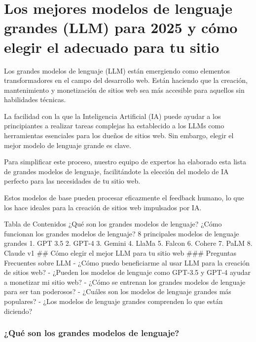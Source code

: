 \documentclass[a4paper12pt]{article}
\begin{document}
    \hypertarget{los-mejores-modelos-de-lenguaje-grandes-llm-para-2025-y-cuxf3mo-elegir-el-adecuado-para-tu-sitio}{%
\section{Los mejores modelos de lenguaje grandes (LLM) para 2025 y cómo
elegir el adecuado para tu
sitio}\label{los-mejores-modelos-de-lenguaje-grandes-llm-para-2025-y-cuxf3mo-elegir-el-adecuado-para-tu-sitio}}

Los grandes modelos de lenguaje (LLM) están emergiendo como elementos
transformadores en el campo del desarrollo web. Están haciendo que la
creación, mantenimiento y monetización de sitios web sea más accesible
para aquellos sin habilidades técnicas.

La facilidad con la que la Inteligencia Artificial (IA) puede ayudar a
los principiantes a realizar tareas complejas ha establecido a los LLMs
como herramientas esenciales para los dueños de sitios web. Sin embargo,
elegir el mejor modelo de lenguaje grande es clave.

Para simplificar este proceso, nuestro equipo de expertos ha elaborado
esta lista de grandes modelos de lenguaje, facilitándote la elección del
modelo de IA perfecto para las necesidades de tu sitio web.

Estos modelos de base pueden procesar eficazmente el feedback humano, lo
que los hace ideales para la creación de sitios web impulsados por IA.

    Tabla de Contenidos ¿Qué son los grandes modelos de lenguaje? ¿Cómo
funcionan los grandes modelos de lenguaje? 8 principales modelos de
lenguaje grandes 1. GPT 3.5 2. GPT-4 3. Gemini 4. LlaMa 5. Falcon 6.
Cohere 7. PaLM 8. Claude v1 \#\# Cómo elegir el mejor LLM para tu sitio
web \#\#\# Preguntas Frecuentes sobre LLM - ¿Cómo puedo beneficiarme al
usar LLM para la creación de sitios web? - ¿Pueden los modelos de
lenguaje como GPT-3.5 y GPT-4 ayudar a monetizar mi sitio web? - ¿Cómo
se entrenan los grandes modelos de lenguaje para ser tan poderosos? -
¿Cuáles son los modelos de lenguaje grandes más populares? - ¿Los
modelos de lenguaje grandes comprenden lo que están diciendo?

    \hypertarget{quuxe9-son-los-grandes-modelos-de-lenguaje}{%
\subsubsection{¿Qué son los grandes modelos de
lenguaje?}\label{quuxe9-son-los-grandes-modelos-de-lenguaje}}
\end{document}

